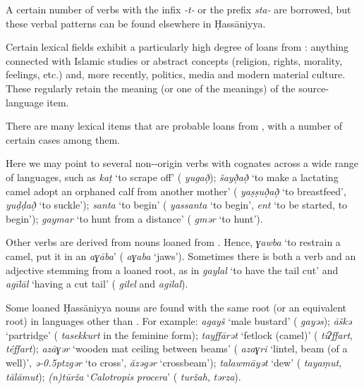 \documentclass[output=paper]{langsci/langscibook}
\begin{document}
A certain number of   verbs with the infix \textit{{}-}\textit{t-} or the prefix \textit{sta-} are borrowed, but these verbal patterns can be found elsewhere in Ḥassāniyya. 

Certain lexical fields exhibit a particularly high degree of loans from  : anything connected with Islamic studies or abstract concepts (religion, rights, morality, feelings, etc.) and, more recently, politics, media and modern material culture. These regularly retain the meaning (or one of the meanings) of the {source-language} item. 


There are many lexical items that are probable loans from , with a number of certain cases among them. 

Here we may point to several non--origin verbs with cognates across a wide range of  languages, such as \textit{k{\R}aṭ} ‘to scrape off’ ( \textit{yug{\R}að̣}); \textit{šayð̣að̣} ‘to make a lactating camel adopt an orphaned calf from another mother’ ( \textit{yaṣṣuð̣að̣} ‘to breastfeed’, \textit{yuḍḍað̣} ‘to suckle’); \textit{santa} ‘to begin’ ( \textit{yassanta} ‘to begin’,  \textit{ent} ‘to be started, to begin’); \textit{gaymar} ‘to hunt from a distance’ ( \textit{gmər} ‘to hunt'). 

Other verbs are derived from nouns loaned from . Hence, \textit{ɣawba} ‘to restrain a camel, put it in an \textit{aɣāba}’ ( \textit{aɣaba} ‘jaws’). Sometimes there is both a verb and an adjective stemming from a loaned {root}, as in \textit{gaylal} ‘to have the tail cut’ and \textit{agīlāl} ‘having a cut tail’ ( \textit{gilel} and \textit{agilal}). 

Some loaned Ḥassāniyya nouns are found with the same {root} (or an equivalent {root}) in  languages other than . For example: \textit{agayš} ‘male bustard’ ( \textit{gayəs}); \textit{āškə{\R}} ‘partridge’ ( \textit{tasekkurt} in the feminine form); \textit{tayffārət} ‘fetlock (camel)’ ( \textit{tiʔffart},  \textit{téffart}); \textit{azāɣər} ‘wooden mat ceiling between beams’ ( \textit{azaɣri} ‘lintel, beam (of a well)’,  \textit{ǝ\kern -0.5ptzgər} ‘to cross’, \textit{ăzəgər} ‘crossbeam’); \textit{talawmāyət} ‘dew’ ( \textit{tayaṃut},  \textit{tălămut}); \textit{(n)tūrža} ‘\textit{Calotropis} \textit{procera}’ ( \textit{turžah},  \textit{tərza}).
\end{document}
